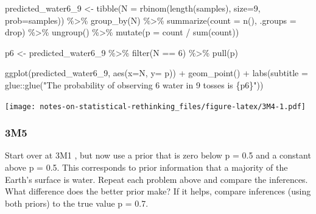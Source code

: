 \documentclass[
]{book}
\newenvironment{Shaded}{\begin{snugshade}}{\end{snugshade}}
\newcommand{\AttributeTok}[1]{\textcolor[rgb]{0.77,0.63,0.00}{#1}}
\newcommand{\DecValTok}[1]{\textcolor[rgb]{0.00,0.00,0.81}{#1}}
\newcommand{\FunctionTok}[1]{\textcolor[rgb]{0.00,0.00,0.00}{#1}}
\newcommand{\NormalTok}[1]{#1}
\newcommand{\OtherTok}[1]{\textcolor[rgb]{0.56,0.35,0.01}{#1}}
\newcommand{\SpecialCharTok}[1]{\textcolor[rgb]{0.00,0.00,0.00}{#1}}
\newcommand{\StringTok}[1]{\textcolor[rgb]{0.31,0.60,0.02}{#1}}
\begin{document}
\begin{Shaded}
\begin{Highlighting}[]
\NormalTok{predicted\_water6\_9 }\OtherTok{\textless{}{-}} 
  \FunctionTok{tibble}\NormalTok{(}\AttributeTok{N =} \FunctionTok{rbinom}\NormalTok{(}\FunctionTok{length}\NormalTok{(samples), }\AttributeTok{size=}\DecValTok{9}\NormalTok{, }\AttributeTok{prob=}\NormalTok{samples)) }\SpecialCharTok{\%\textgreater{}\%}
  \FunctionTok{group\_by}\NormalTok{(N) }\SpecialCharTok{\%\textgreater{}\%}
  \FunctionTok{summarize}\NormalTok{(}\AttributeTok{count =} \FunctionTok{n}\NormalTok{(), }\AttributeTok{.groups =} \StringTok{\textquotesingle{}drop\textquotesingle{}}\NormalTok{)  }\SpecialCharTok{\%\textgreater{}\%}
  \FunctionTok{ungroup}\NormalTok{() }\SpecialCharTok{\%\textgreater{}\%}
  \FunctionTok{mutate}\NormalTok{(}\AttributeTok{p =}\NormalTok{ count }\SpecialCharTok{/} \FunctionTok{sum}\NormalTok{(count))}
  
\NormalTok{p6 }\OtherTok{\textless{}{-}} 
\NormalTok{  predicted\_water6\_9 }\SpecialCharTok{\%\textgreater{}\%}
  \FunctionTok{filter}\NormalTok{(N }\SpecialCharTok{==} \DecValTok{6}\NormalTok{) }\SpecialCharTok{\%\textgreater{}\%}
  \FunctionTok{pull}\NormalTok{(p)}

\FunctionTok{ggplot}\NormalTok{(predicted\_water6\_9, }\FunctionTok{aes}\NormalTok{(}\AttributeTok{x=}\NormalTok{N, }\AttributeTok{y=}\NormalTok{ p)) }\SpecialCharTok{+} 
    \FunctionTok{geom\_point}\NormalTok{() }\SpecialCharTok{+} 
  \FunctionTok{labs}\NormalTok{(}\AttributeTok{subtitle =}\NormalTok{ glue}\SpecialCharTok{::}\FunctionTok{glue}\NormalTok{(}\StringTok{"The probability of observing 6 water in 9 tosses is \{p6\}"}\NormalTok{))}
\end{Highlighting}
\end{Shaded}

\texttt{[image: notes-on-statistical-rethinking\_files/figure-latex/3M4-1.pdf]}

\hypertarget{m5-1}{%
\subsubsection*{3M5}\label{m5-1}}

Start over at 3M1 , but now use a prior that is zero below p = 0.5 and a constant above p = 0.5. This corresponds to prior information that a majority of the Earth's surface is water. Repeat each problem above and compare the inferences. What difference does the better prior make? If it helps, compare inferences (using both priors) to the true value p = 0.7.
\end{document}
